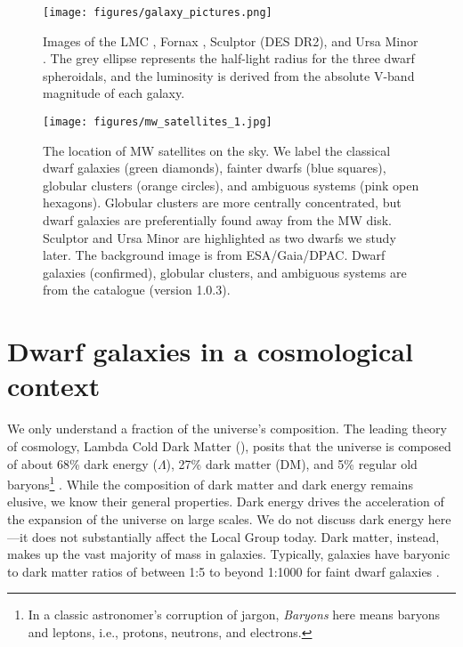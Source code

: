 \begin{figure}
\centering
\texttt{[image: figures/galaxy\_pictures.png]}
\caption[Images of dwarf galaxies]{Images\footnotemark{} of the LMC
\citep[Digitized Sky Survey II,][]{lasker+1996}, Fornax \citep[DES
DR2,][]{abbott+2021}, Sculptor (DES DR2), and Ursa Minor
\citep[UNWISE,][with \textit{Gaia} point sources
overplotted]{lang2014, meisner+lang+schlegel2017, meisner+lang+schlegel2017a}.
The grey ellipse represents the half-light radius for the three dwarf
spheroidals, and the luminosity is derived from the absolute V-band
magnitude of each galaxy.}\label{fig:galaxy_images}
\end{figure}

\begin{figure}
\centering
\texttt{[image: figures/mw\_satellites\_1.jpg]}
\caption[The on-sky distribution of Milky Way satellites]{The location
of MW satellites on the sky. We label the classical dwarf galaxies
(green diamonds), fainter dwarfs (blue squares), globular clusters
(orange circles), and ambiguous systems (pink open hexagons). Globular
clusters are more centrally concentrated, but dwarf galaxies are
preferentially found away from the MW disk. Sculptor and Ursa Minor are
highlighted as two dwarfs we study later. The background image is from
ESA/Gaia/DPAC.\footnotemark{} Dwarf galaxies (confirmed), globular
clusters, and ambiguous systems are from the \citet{pace2024} catalogue
(version 1.0.3).}\label{fig:mw_satellite_system}
\end{figure}

\section{Dwarf galaxies in a cosmological
context}\label{dwarf-galaxies-in-a-cosmological-context}

We only understand a fraction of the universe's composition. The leading
theory of cosmology, Lambda Cold Dark Matter (\LCDM{}), posits that the
universe is composed of about 68\% dark energy (\(\Lambda\)), 27\% dark
matter (DM), and 5\% regular old baryons\footnote{In a classic
  astronomer's corruption of jargon, \emph{Baryons} here means baryons
  and leptons, i.e., protons, neutrons, and electrons.}
\citep{planckcollaboration+2020}. While the composition of dark matter
and dark energy remains elusive, we know their general properties. Dark
energy drives the acceleration of the expansion of the universe on large
scales. We do not discuss dark energy here---it does not substantially
affect the Local Group today. Dark matter, instead, makes up the vast
majority of mass in galaxies. Typically, galaxies have baryonic to dark
matter ratios of between 1:5 to beyond 1:1000 for faint dwarf galaxies
\citep[e.g.,][]{hayashi+2023}.

